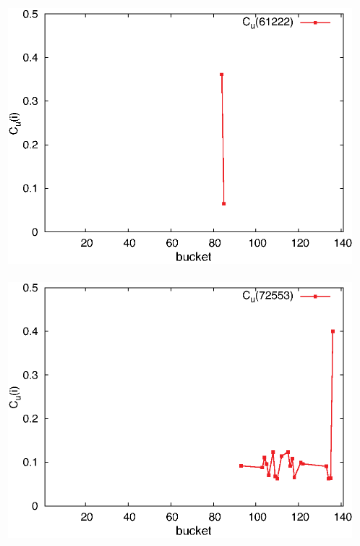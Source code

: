 \begin{figure}[H]
\begin{subfigure}[b]{0.32\textwidth}
          \includegraphics[width=\textwidth]{chapters/03_implementation/u61222}
        \end{subfigure}
        \begin{subfigure}[b]{0.32\textwidth}
          \centering
          \includegraphics[width=\textwidth]{chapters/03_implementation/u72553}
        \end{subfigure}
        \begin{subfigure}[b]{0.32\textwidth}
          \centering

\end{subfigure}
\end{figure}
